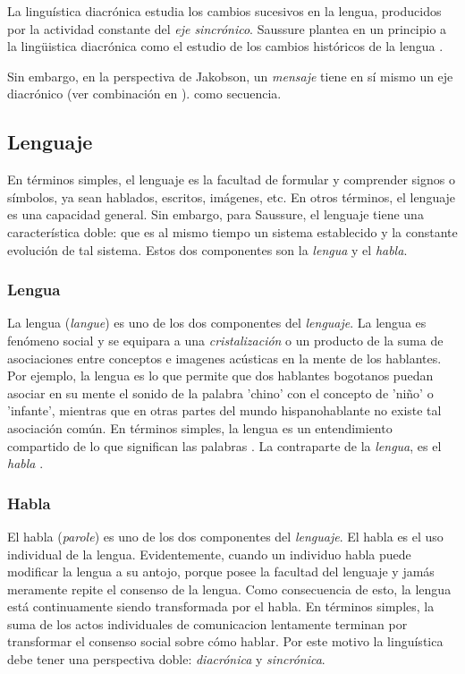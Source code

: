 \documentclass[12pt,letterpaper,twoside]{article}
\begin{document}
La linguística diacrónica estudia los cambios sucesivos en la
lengua, producidos por la actividad constante del \emph{eje
sincrónico}. Saussure plantea en un principio a la lingüistica
diacrónica como el estudio de los cambios históricos de la
lengua \cite{alonso1945curso}.


Sin embargo, en la perspectiva de Jakobson, un \emph{mensaje} tiene en
sí mismo un eje diacrónico (ver combinación en ).
como secuencia. 

\subsection{Lenguaje}
\label{sec:org47ca62a}
En términos simples, el lenguaje es la facultad de formular y
comprender signos o símbolos, ya sean hablados, escritos,
imágenes, etc.  En otros términos, el lenguaje es una capacidad
general. Sin embargo, para Saussure, el lenguaje tiene una
característica doble: que es al mismo tiempo un sistema
establecido y la constante evolución de tal sistema. Estos dos
componentes son la \emph{lengua} y el \emph{habla}.

\subsubsection{Lengua}
\label{sec:org52bf584}

La lengua (\emph{langue}) es uno de los dos componentes del
\emph{lenguaje}.  La lengua es fenómeno social y se equipara a una
\emph{cristalización} o un producto de la suma de asociaciones entre
conceptos e imagenes acústicas en la mente de los hablantes. Por
ejemplo, la lengua es lo que permite que dos hablantes bogotanos
puedan asociar en su mente el sonido de la palabra 'chino' con el
concepto de 'niño' o 'infante', mientras que en otras partes del
mundo hispanohablante no existe tal asociación común.  En
términos simples, la lengua es un entendimiento compartido de lo
que significan las palabras \cite[pg. 102]{alonso1945curso}. La
contraparte de la \emph{lengua}, es el \emph{habla} .

\subsubsection{Habla}
\label{sec:orga69a402}
El habla (\emph{parole}) es uno de los dos componentes del
\emph{lenguaje}. El habla es el uso individual de la lengua.
Evidentemente, cuando un individuo habla puede modificar
la lengua a su antojo, porque posee la facultad del
lenguaje y jamás meramente repite el consenso de la lengua.
Como consecuencia de esto, la lengua está continuamente
siendo transformada por el habla. En términos simples,
la suma de los actos individuales de comunicacion lentamente
terminan por transformar el consenso social sobre cómo
hablar.  Por este motivo la linguística debe tener una
perspectiva doble: \emph{diacrónica} y \emph{sincrónica}.
\end{document}
